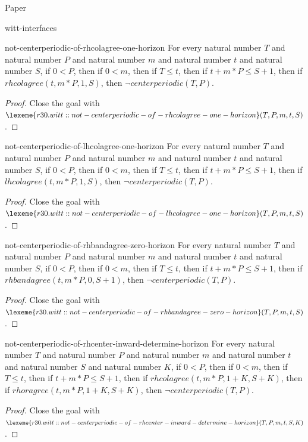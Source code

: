\begin{lexlean}{Paper}
\begin{section}{witt-interfaces}
  \begin{theorem}{not-centerperiodic-of-rhcolagree-one-horizon}
  For every natural number \(T\) and natural number \(P\) and natural number \(m\) and natural number \(t\) and natural number \(S\), if \(0 < P\), then if \(0 < m\), then if \(T ≤ t\), then if \(t + m * P ≤ S + 1\), then if \(rhcolagree(t, m * P, 1, S)\), then \(¬ centerperiodic(T, P)\).
  \begin{proof}
  Close the goal with \(\lexeme{r30.witt::not-centerperiodic-of-rhcolagree-one-horizon}(T, P, m, t, S)\).
  \end{proof}
  \end{theorem}

  \begin{theorem}{not-centerperiodic-of-lhcolagree-one-horizon}
  For every natural number \(T\) and natural number \(P\) and natural number \(m\) and natural number \(t\) and natural number \(S\), if \(0 < P\), then if \(0 < m\), then if \(T ≤ t\), then if \(t + m * P ≤ S + 1\), then if \(lhcolagree(t, m * P, 1, S)\), then \(¬ centerperiodic(T, P)\).
  \begin{proof}
  Close the goal with \(\lexeme{r30.witt::not-centerperiodic-of-lhcolagree-one-horizon}(T, P, m, t, S)\).
  \end{proof}
  \end{theorem}

  \begin{theorem}{not-centerperiodic-of-rhbandagree-zero-horizon}
  For every natural number \(T\) and natural number \(P\) and natural number \(m\) and natural number \(t\) and natural number \(S\), if \(0 < P\), then if \(0 < m\), then if \(T ≤ t\), then if \(t + m * P ≤ S + 1\), then if \(rhbandagree(t, m * P, 0, S + 1)\), then \(¬ centerperiodic(T, P)\).
  \begin{proof}
  Close the goal with \(\lexeme{r30.witt::not-centerperiodic-of-rhbandagree-zero-horizon}(T, P, m, t, S)\).
  \end{proof}
  \end{theorem}

  \begin{theorem}{not-centerperiodic-of-rhcenter-inward-determine-horizon}
  For every natural number \(T\) and natural number \(P\) and natural number \(m\) and natural number \(t\) and natural number \(S\) and natural number \(K\), if \(0 < P\), then if \(0 < m\), then if \(T ≤ t\), then if \(t + m * P ≤ S + 1\), then if \(rhcolagree(t, m * P, 1 + K, S + K)\), then if \(rhoragree(t, m * P, 1 + K, S + K)\), then \(¬ centerperiodic(T, P)\).
  \begin{proof}
  Close the goal with \(\lexeme{r30.witt::not-centerperiodic-of-rhcenter-inward-determine-horizon}(T, P, m, t, S, K)\).
  \end{proof}
  \end{theorem}


\end{section}
\end{lexlean}
